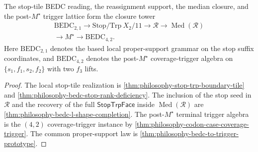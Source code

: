 \begin{theorem}
\label{thm:philosophy-bedc-closure-tower-theorem}
The stop-tile BEDC reading, the reassignment support, the median closure,
and the post-$M^{\star}$ trigger lattice form the closure tower
$$
\begin{gathered}
  \mathrm{BEDC}_{2,1}
  \longrightarrow
  \mathrm{Stop}/\mathrm{Trp}\ X_{2}/11
  \longrightarrow
  \mathcal{R}
  \longrightarrow
  \operatorname{Med}(\mathcal{R})\\
  \longrightarrow
  M^{\star}
  \longrightarrow
  \mathrm{BEDC}_{4,2}.
\end{gathered}
$$
Here $\mathrm{BEDC}_{2,1}$ denotes the based local proper-support grammar
on the stop suffix coordinates, and $\mathrm{BEDC}_{4,2}$ denotes the
post-$M^{\star}$ coverage-trigger algebra on
$\{s_{1},f_{1},s_{2},f_{2}\}$ with two $f_{3}$ lifts.
\end{theorem}
\begin{proof}
The local stop-tile realization is
\autoref{thm:philosophy-stop-trp-boundary-tile} and
\autoref{thm:philosophy-bedc-stop-rank-deficiency}. The inclusion of the
stop seed in $\mathcal{R}$ and the recovery of the full
$\mathsf{StopTrpFace}$ inside $\operatorname{Med}(\mathcal{R})$ are
\autoref{thm:philosophy-bedc-l-shape-completion}. The post-$M^{\star}$
terminal trigger algebra is the $(4,2)$ coverage-trigger instance by
\autoref{thm:philosophy-codon-case-coverage-trigger}. The common
proper-support law is
\autoref{thm:philosophy-bedc-to-trigger-prototype}.
\end{proof}

